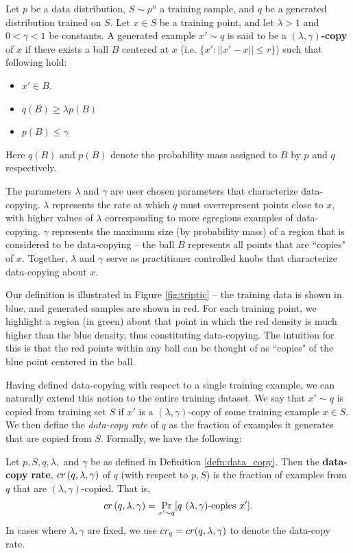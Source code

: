 \begin{definition}\label{defn:data_copy}
Let $p$ be a data distribution, $S \sim p^n$ a training sample, and $q$ be a generated distribution trained on $S$. Let $x \in S$ be a training  point, and let $\lambda > 1$ and $0 < \gamma < 1$ be constants. A generated example $x' \sim q$ is said to be a \textbf{$(\lambda, \gamma)$-copy} of $x$ if there exists a ball $B$ centered at $x$ (i.e. $\{x': ||x' - x|| \leq r\}$) such that following hold:
\begin{itemize}
	\item $x' \in B$.
	\item $q(B) \geq \lambda p(B)$
	\item $p(B) \leq \gamma$
\end{itemize}
\end{definition}

Here $q(B)$ and $p(B)$ denote the probability mass assigned to $B$ by $p$ and $q$ respectively.

The parameters $\lambda$ and $\gamma$ are user chosen parameters that characterize data-copying. $\lambda$ represents the rate at which $q$ must overrepresent points close to $x$, with higher values of $\lambda$ corresponding to more egregious examples of data-copying. $\gamma$ represents the maximum size (by probability mass) of a region that is considered to be data-copying -- the ball $B$ represents all points that are ``copies" of $x$. Together, $\lambda$ and $\gamma$ serve as practitioner controlled knobs that characterize data-copying about $x$.

Our definition is illustrated in Figure \ref{fig:triptic} -- the training data is shown in blue, and generated samples are shown in red. For each training point, we highlight a region (in green) about that point in which the red density is much higher than the blue density, thus constituting data-copying. The intuition for this is that the red points within any ball can be thought of as ``copies" of the blue point centered in the ball.

Having defined data-copying with respect to a single training example, we can naturally extend this notion to the entire training dataset. We say that $x' \sim q$ is copied from training set $S$ if $x'$ is a $(\lambda,\gamma)$-copy of some training example $x \in S$. We then define the \textit{data-copy rate} of $q$ as the fraction of examples it generates that are copied from $S$. Formally, we have the following: 

\begin{definition}
Let $p, S, q, \lambda,$ and $\gamma$ be as defined in Definition \ref{defn:data_copy}. Then the \textbf{data-copy rate}, $cr\left(q, \lambda, \gamma\right)$ of $q$ (with respect to $p, S$) is the fraction of examples from $q$ that are $(\lambda, \gamma)$-copied. That is, $$cr\left(q, \lambda, \gamma\right) = \Pr_{x' \sim q}[q\text{ }(\lambda,\gamma)\text{-copies }x'].$$ In cases where $\lambda, \gamma$ are fixed, we use $cr_q = cr(q, \lambda, \gamma)$ to denote the data-copy rate.
\end{definition}

